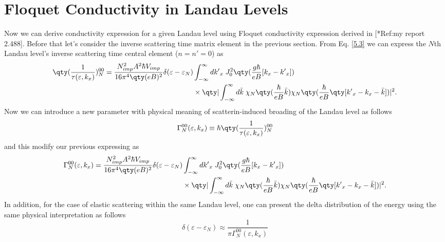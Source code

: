 \section{Floquet Conductivity in Landau Levels}

Now we can derive conductivity expression for a given Landau level using Floquet conductivity expression derived in [*Ref:my report 2.488]. Before that let's consider the inverse scattering time matrix element in the previous section. From Eq. \eqref{5.3} we can express the $N$th Landau level's inverse scattering time central element ($n=n'=0$) as
\begin{equation} \label{6.1}
  \begin{aligned}
    \qty(\frac{1}{\tau(\varepsilon,k_x)})^{00}_{N} =
    \frac { N_{imp}^2 A^2 \hbar V_{imp}}{16\pi^4 \qty(eB)^2}
    \delta(\varepsilon - \varepsilon_{N}) &
    \int_{-\infty}^{\infty} d {k'}_x \;
    J_0^2\qty(\frac{g\hbar}{eB}[{k}_x - {k'}_x])
    \\
    & \times
    \qty|
    \int_{-\infty}^{\infty} d\bar{k} \;
    {\chi}_{N}\qty(\frac{\hbar}{eB}\bar{k})
    {\chi}_{N}\qty(\frac{\hbar}{eB} \qty[{k'}_x - {k}_x - \bar{k}])|^2.
  \end{aligned}
\end{equation}
Now we can introduce a new parameter with physical meaning of scatterin-induced broading of the Landau level as follows
\begin{equation} \label{6.2}
  \Gamma^{00}_{N}(\varepsilon,k_x) \equiv \hbar \qty(\frac{1}{\tau(\varepsilon,k_x)})^{00}_{N}
\end{equation}
and this modify our previous expressing as
\begin{equation} \label{6.3}
  \begin{aligned}
    \Gamma^{00}_{N}(\varepsilon,k_x)  =
    \frac { N_{imp}^2 A^2 \hbar V_{imp}}{16\pi^4 \qty(eB)^2}
    \delta(\varepsilon - \varepsilon_{N}) &
    \int_{-\infty}^{\infty} d {k'}_x \;
    J_0^2\qty(\frac{g\hbar}{eB}[{k}_x - {k'}_x])
    \\
    & \times
    \qty|
    \int_{-\infty}^{\infty} d\bar{k} \;
    {\chi}_{N}\qty(\frac{\hbar}{eB}\bar{k})
    {\chi}_{N}\qty(\frac{\hbar}{eB} \qty[{k'}_x - {k}_x - \bar{k}])|^2.
  \end{aligned}
\end{equation}
In addition, for the case of elastic scattering within the same Landau level, one can present the delta distribution of the energy using the same physical interpretation as follows
\begin{equation} \label{6.4}
  \delta(\varepsilon - \varepsilon_{N}) \approx
  \frac{1}{\pi \Gamma^{00}_{N}(\varepsilon,k_x)}
\end{equation}

